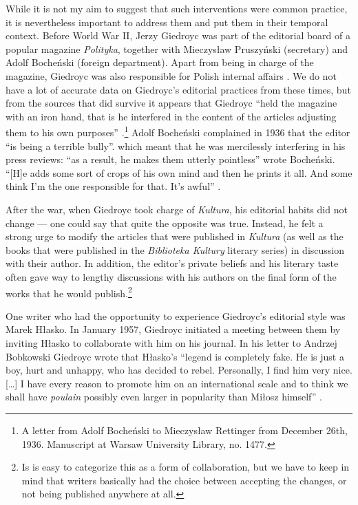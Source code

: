 \begin{paper}
While it is not my aim to suggest that such interventions were common practice, it is nevertheless important to address them and put them in their temporal context. Before World War II, Jerzy Giedroyc was part of the editorial board of a popular magazine
\emph{Polityka}, together with
Mieczysław Pruszyński (secretary) and Adolf Bocheński (foreign
department). Apart from being in charge of
the magazine, Giedroyc was also responsible for Polish internal
affairs \citep[26]{habielski_dokad_2006}. We do not
have a lot of accurate data on Giedroyc's editorial practices from these
times, but from the sources that did survive it appears that Giedroyc ``held the magazine with an iron hand, that is he
interfered in the content of the articles adjusting them to his own
purposes'' \citep[27]{habielski_dokad_2006}.\footnote{A letter from Adolf Bocheński to Mieczysław Rettinger from
December 26th, 1936. Manuscript at Warsaw University Library, no.
1477.} Adolf Bocheński
complained in 1936 that the editor ``is being a terrible bully''. which
meant that he was mercilessly interfering in his press
reviews: ``as a result, he makes them utterly pointless'' wrote Bocheński.
``[H]e adds some sort of crops of his own mind and then he prints it all.
And some think I'm the one responsible for that. It's awful'' \citep[27]{habielski_dokad_2006}.

After the war, when Giedroyc took charge of \emph{Kultura},
his editorial habits did not change --- one could say that quite the
opposite was true. Instead, he felt a strong urge to modify the articles that were published in \emph{Kultura} (as well as the books that were
published in the \emph{Biblioteka Kultury} literary series) in discussion with their author. In addition, the editor's private beliefs and his
literary taste often gave way to lengthy discussions with his authors on the final form of the works that he would publish.\footnote{Is is easy to categorize this as a form of collaboration, but we have to keep in mind that writers basically had the
  choice between accepting the changes, or not being published anywhere at all.}

One writer who had the opportunity to experience Giedroyc's editorial style was Marek Hłasko. In January 1957, Giedroyc initiated a
meeting between them by inviting Hłasko to collaborate with him on his journal. In his letter to Andrzej Bobkowski Giedroyc wrote that Hłasko's ``legend is completely fake. He is just a boy, hurt and unhappy, who has
decided to rebel. Personally, I find him very nice. {[}\ldots{}{]} I have
every reason to promote him on an international scale and to think we
shall have \emph{poulain} possibly even larger in popularity than Miłosz
himself'' \citep[511--12]{zielinski_j_1996}.


\end{paper}
